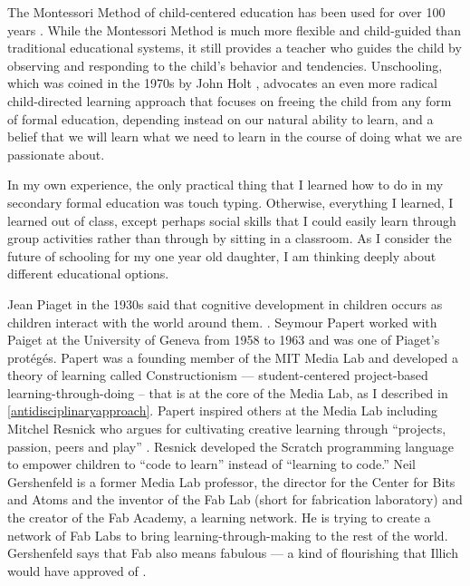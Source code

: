 The Montessori Method \cite{montessori2013montessori} of child-centered education has been used for over 100 years \cite{montessoriintro}. While the Montessori Method is much more flexible and child-guided than traditional educational systems, it still provides a teacher who guides the child by observing and responding to the child's behavior and tendencies. Unschooling, which was coined in the 1970s by John Holt \cite{unschooling}, advocates an even more radical child-directed learning approach that focuses on freeing the child from any form of formal education, depending instead on our natural ability to learn, and a belief that we will learn what we need to learn in the course of doing what we are passionate about.

In my own experience, the only practical thing that I learned how to do in my secondary formal education was touch typing. Otherwise, everything I learned, I learned out of class, except perhaps social skills that I could easily learn through group activities rather than through by sitting in a classroom. As I consider the future of schooling for my one year old daughter, I am thinking deeply about different educational options.

Jean Piaget in the 1930s said that cognitive development in children occurs as children interact with the world around them. \cite{piaget1952origins}. Seymour Papert worked with Paiget at the University of Geneva from 1958 to 1963 \cite{SeymourP62:online} and was one of Piaget's protégés. Papert was a founding member of the MIT Media Lab and developed a theory of learning called Constructionism --- student-centered project-based learning-through-doing -- that is at the core of the Media Lab, as I described in \autoref{antidisciplinaryapproach}. Papert inspired others at the Media Lab including Mitchel Resnick who argues for cultivating creative learning through ``projects, passion, peers and play'' \cite{resnick_lifelong_2018}. Resnick developed the Scratch programming language to empower children to ``code to learn'' instead of ``learning to code.'' Neil Gershenfeld is a former Media Lab professor, the director for the Center for Bits and Atoms and the inventor of the Fab Lab (short for fabrication laboratory) and the creator of the Fab Academy, a learning network. He is trying to create a network of Fab Labs to bring learning-through-making to the rest of the world. Gershenfeld says that Fab also means fabulous --- a kind of flourishing that Illich would have approved of \cite{gershenfeld2008fab}.


